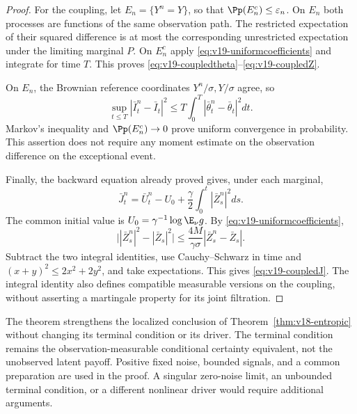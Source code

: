 \begin{proof}
For the coupling, let $E_n=\{Y^n=Y\}$, so that
$\Pp(E_n^c)\le\varepsilon_n$. On $E_n$ both processes are functions of
the same observation path. The restricted expectation of their squared
difference is at most the corresponding unrestricted expectation under the
limiting marginal $P$. On $E_n^c$ apply
\eqref{eq:v19-uniformcoefficients} and integrate for time $T$. This proves
\eqref{eq:v19-coupledtheta}--\eqref{eq:v19-coupledZ}.

On $E_n$, the Brownian reference coordinates $Y^n/\sigma,Y/\sigma$
agree, so
\[
 \sup_{t\le T}|\bar I_t^n-\bar I_t|^2
       \le T\int_0^T|\bar\theta_t^n-\bar\theta_t|^2dt.
\]
Markov's inequality and $\Pp(E_n^c)\to0$ prove uniform convergence in
probability. This assertion does not require any moment estimate on the
observation difference on the exceptional event.

Finally, the backward equation already proved gives, under each marginal,
\[
 \bar J_t^n=\bar U_t^n-U_0
                   +\frac\gamma2\int_0^t|\bar Z_s^n|^2ds.
\]
The common initial value is $U_0=\gamma^{-1}\log\E_\nu g$.
By \eqref{eq:v19-uniformcoefficients},
\[
 \big||\bar Z_s^n|^2-|\bar Z_s|^2\big|
             \le\frac{4M}{\gamma\sigma}|\bar Z_s^n-\bar Z_s|.
\]
Subtract the two integral identities, use Cauchy--Schwarz in time and
$(x+y)^2\le2x^2+2y^2$, and take expectations. This gives
\eqref{eq:v19-coupledJ}. The integral identity also defines compatible
measurable versions on the coupling, without asserting a martingale
property for its joint filtration.
\end{proof}

The theorem strengthens the localized conclusion of
Theorem~\ref{thm:v18-entropic} without changing its terminal condition or
its driver. The terminal condition remains the observation-measurable
conditional certainty equivalent, not the unobserved latent payoff.
Positive fixed noise, bounded signals, and a common preparation are used
in the proof. A singular zero-noise limit, an unbounded terminal condition,
or a different nonlinear driver would require additional arguments.
